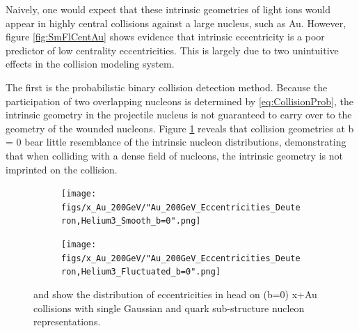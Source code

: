 \documentclass[twocolumn,showpacs,amsfonts,aps,prc,nofootinbib,floatfix]{revtex4}
\begin{document}
Naively, one would expect that these intrinsic geometries of light ions would appear in highly central collisions against a large nucleus, such as Au. However, figure \ref{fig:SmFlCentAu} shows evidence that intrinsic eccentricity is a poor predictor of low centrality eccentricities. This is largely due to two unintuitive effects in the collision modeling system. 

The first is the probabilistic binary collision detection method. Because the participation of two overlapping nucleons is determined by \ref{eq:CollisionProb}, the intrinsic geometry in the projectile nucleus is not guaranteed to carry over to the geometry of the wounded nucleons. Figure \ref{fig:SmFlAub=0} reveals that collision geometries at b = 0 bear little resemblance of the intrinsic nucleon distributions, demonstrating that when colliding with a dense field of nucleons, the intrinsic geometry is not imprinted on the collision.

\begin{figure}
	\begin{center}
		\begin{subfigure}[t]{0.4\linewidth}
			\texttt{[image: figs/x\_Au\_200GeV/"Au\_200GeV\_Eccentricities\_Deuteron,Helium3\_Smooth\_b=0".png]}
		\end{subfigure}
		\begin{subfigure}[t]{0.4\linewidth}
			\texttt{[image: figs/x\_Au\_200GeV/"Au\_200GeV\_Eccentricities\_Deuteron,Helium3\_Fluctuated\_b=0".png]}
		\end{subfigure}
		\caption{ and  show the distribution of eccentricities in head on (b=0) x+Au collisions with single Gaussian and quark sub-structure nucleon representations.}
		\label{fig:SmFlAub=0}
	\end{center}
\end{figure} 
\end{document}
